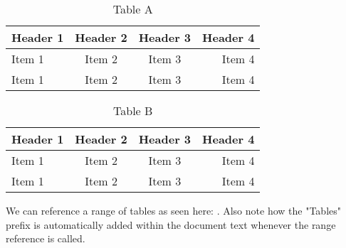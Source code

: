 \begin{table}[H]
   \caption{Table A} 
   \label{tab:tab-a}
   \small %
   \centering %
   \begin{tabular}{lccr} %
   \toprule[\heavyrulewidth]\toprule[\heavyrulewidth]
   \textbf{Header 1} & \textbf{Header 2} & \textbf{Header 3} & \textbf{Header 4} \\ 
   \midrule
   Item 1 & Item 2 & Item 3 & Item 4 \\
   Item 1 & Item 2 & Item 3 & Item 4\\
   \bottomrule[\heavyrulewidth] 
   \end{tabular}
\end{table}

\begin{table}[H]
   \caption{Table B} 
   \label{tab:tab-b}
   \small %
   \centering %
   \begin{tabular}{lccr} %
   \toprule[\heavyrulewidth]\toprule[\heavyrulewidth]
   \textbf{Header 1} & \textbf{Header 2} & \textbf{Header 3} & \textbf{Header 4} \\ 
   \midrule
   Item 1 & Item 2 & Item 3 & Item 4 \\
   Item 1 & Item 2 & Item 3 & Item 4\\
   \bottomrule[\heavyrulewidth] 
   \end{tabular}
\end{table}

We can reference a range of tables as seen here: .
Also note how the "Tables" prefix is automatically added within the document text whenever the range reference is called.